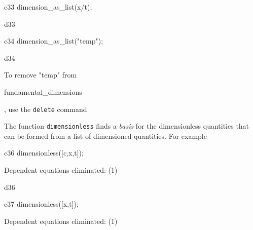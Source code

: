 \documentclass[12pt]{article}
\begin{document}
\begin{mcline}{c33}
dimension_as_list(x/t);
\end{mcline}



\begin{mdline}{d33}
\left[ 0,1,-1,0 \right] 
\end{mdline}

\begin{mcline}{c34}
dimension_as_list("temp");
\end{mcline}



\begin{mdline}{d34}
\left[ 0,0,0,1 \right] 
\end{mdline}


\vspace{0.1in}

\noindent To remove "temp" from  
\begin{verb} fundamental_dimensions \end{verb}, use the {\tt delete} command

\vspace{0.1in}





\vspace{0.1in}


The function {\tt dimensionless} finds a {\em basis\/} for the
dimensionless quantities that can be formed from a list of
dimensioned  quantities.  For example

\vspace{0.1in}




\begin{mcline}{c36}
dimensionless([c,x,t]);
\end{mcline}


Dependent equations eliminated:  (1)


\begin{mdline}{d36}
\end{mdline}

\begin{mcline}{c37}
dimensionless([x,t]);
\end{mcline}


Dependent equations eliminated:  (1)
\end{document}
